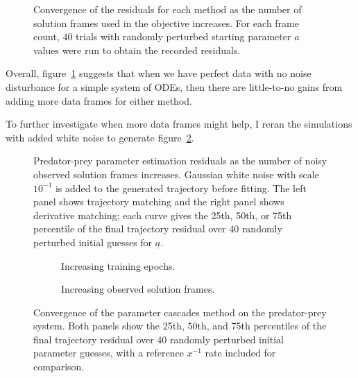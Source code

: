 \documentclass{article}
\begin{document}
\begin{figure}[htpb]
    \centering
    
    \caption{Convergence of the residuals for each method as the number of solution frames used in the objective increases. For each frame count, $40$ trials with randomly perturbed starting parameter $a$ values were run to obtain the recorded residuals.}
    \label{fig:population_residuals_trajectory_derivative_frames}
\end{figure}

Overall, figure~\ref{fig:population_residuals_trajectory_derivative_frames} suggests that when we have perfect data with no noise disturbance for a simple system of ODEs, then there are little-to-no gains from adding more data frames for either method.

To further investigate when more data frames might help, I reran the simulations with added white noise to generate figure~\ref{fig:population_residuals_trajectory_derivative_frames_noise}.

\begin{figure}[htpb]
    \centering
    
    \caption{Predator-prey parameter estimation residuals as the number of noisy observed solution frames increases. Gaussian white noise with scale $10^{-1}$ is added to the generated trajectory before fitting. The left panel shows trajectory matching and the right panel shows derivative matching; each curve gives the 25th, 50th, or 75th percentile of the final trajectory residual over 40 randomly perturbed initial guesses for $\underline{a}$.}
    \label{fig:population_residuals_trajectory_derivative_frames_noise}
\end{figure}

\begin{figure}[htpb]
    \centering
    \begin{subfigure}{0.49\linewidth}
        \centering
        
        \caption{Increasing training epochs.}
        \label{fig:cascade_residual_convergence_epochs}
    \end{subfigure}
    \hfill
    \begin{subfigure}{0.49\linewidth}
        \centering
        
        \caption{Increasing observed solution frames.}
        \label{fig:cascade_residual_convergence_frames}
    \end{subfigure}
    \caption{Convergence of the parameter cascades method on the predator-prey system. Both panels show the 25th, 50th, and 75th percentiles of the final trajectory residual over 40 randomly perturbed initial parameter guesses, with a reference $x^{-1}$ rate included for comparison.}
    \label{fig:cascade_residual_convergence}
\end{figure}
\end{document}
